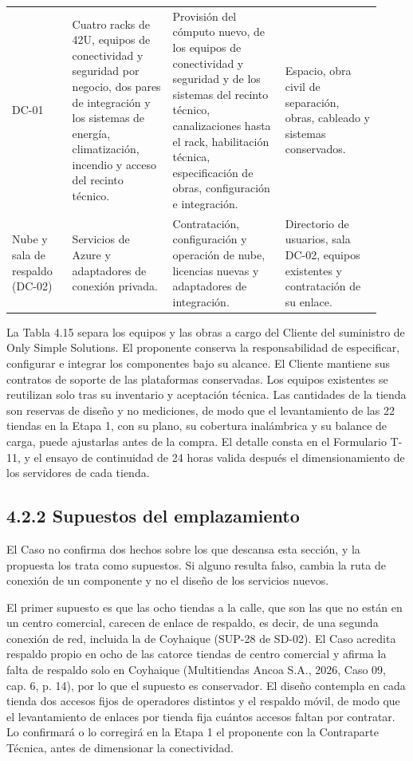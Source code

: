 \documentclass[11pt]{article}
\begin{document}
\begin{longtable}{@{}p{0.15\linewidth}p{0.25\linewidth}p{0.28\linewidth}p{0.24\linewidth}@{}}
DC-01 & Cuatro racks de 42U, equipos de conectividad y seguridad por negocio, dos pares de integración y los sistemas de energía, climatización, incendio y acceso del recinto técnico. & Provisión del cómputo nuevo, de los equipos de conectividad y seguridad y de los sistemas del recinto técnico, canalizaciones hasta el rack, habilitación técnica, especificación de obras, configuración e integración. & Espacio, obra civil de separación, obras, cableado y sistemas conservados. \\
Nube y sala de respaldo (DC-02) & Servicios de Azure y adaptadores de conexión privada. & Contratación, configuración y operación de nube, licencias nuevas y adaptadores de integración. & Directorio de usuarios, sala DC-02, equipos existentes y contratación de su enlace. \\
\end{longtable}

La Tabla 4.15 separa los equipos y las obras a cargo del Cliente del suministro de Only Simple Solutions. El proponente conserva la responsabilidad de especificar, configurar e integrar los componentes bajo su alcance. El Cliente mantiene sus contratos de soporte de las plataformas conservadas. Los equipos existentes se reutilizan solo tras su inventario y aceptación técnica. Las cantidades de la tienda son reservas de diseño y no mediciones, de modo que el levantamiento de las 22 tiendas en la Etapa 1, con su plano, su cobertura inalámbrica y su balance de carga, puede ajustarlas antes de la compra. El detalle consta en el Formulario T-11, y el ensayo de continuidad de 24 horas valida después el dimensionamiento de los servidores de cada tienda.

\subsection{4.2.2 Supuestos del emplazamiento}

El Caso no confirma dos hechos sobre los que descansa esta sección, y la propuesta los trata como supuestos. Si alguno resulta falso, cambia la ruta de conexión de un componente y no el diseño de los servicios nuevos.

El primer supuesto es que las ocho tiendas a la calle, que son las que no están en un centro comercial, carecen de enlace de respaldo, es decir, de una segunda conexión de red, incluida la de Coyhaique (SUP-28 de SD-02). El Caso acredita respaldo propio en ocho de las catorce tiendas de centro comercial y afirma la falta de respaldo solo en Coyhaique (Multitiendas Ancoa S.A., 2026, Caso 09, cap. 6, p. 14), por lo que el supuesto es conservador. El diseño contempla en cada tienda dos accesos fijos de operadores distintos y el respaldo móvil, de modo que el levantamiento de enlaces por tienda fija cuántos accesos faltan por contratar. Lo confirmará o lo corregirá en la Etapa 1 el proponente con la Contraparte Técnica, antes de dimensionar la conectividad.
\end{document}

